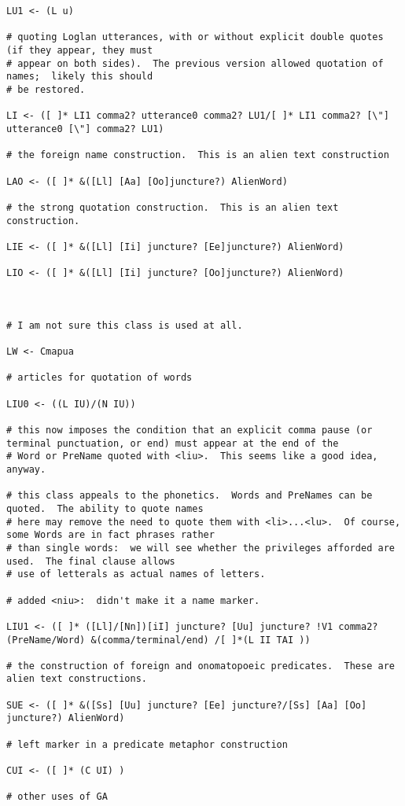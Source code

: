\documentclass[12pt]{book}
\begin{document}
{\begin{verbatim}
LU1 <- (L u)

# quoting Loglan utterances, with or without explicit double quotes (if they appear, they must
# appear on both sides).  The previous version allowed quotation of names;  likely this should
# be restored.

LI <- ([ ]* LI1 comma2? utterance0 comma2? LU1/[ ]* LI1 comma2? [\"] utterance0 [\"] comma2? LU1)

# the foreign name construction.  This is an alien text construction

LAO <- ([ ]* &([Ll] [Aa] [Oo]juncture?) AlienWord)

# the strong quotation construction.  This is an alien text construction.

LIE <- ([ ]* &([Ll] [Ii] juncture? [Ee]juncture?) AlienWord)

LIO <- ([ ]* &([Ll] [Ii] juncture? [Oo]juncture?) AlienWord)



# I am not sure this class is used at all.

LW <- Cmapua

# articles for quotation of words

LIU0 <- ((L IU)/(N IU))

# this now imposes the condition that an explicit comma pause (or terminal punctuation, or end) must appear at the end of the
# Word or PreName quoted with <liu>.  This seems like a good idea, anyway.

# this class appeals to the phonetics.  Words and PreNames can be quoted.  The ability to quote names
# here may remove the need to quote them with <li>...<lu>.  Of course, some Words are in fact phrases rather
# than single words:  we will see whether the privileges afforded are used.  The final clause allows
# use of letterals as actual names of letters.

# added <niu>:  didn't make it a name marker.

LIU1 <- ([ ]* ([Ll]/[Nn])[iI] juncture? [Uu] juncture? !V1 comma2? (PreName/Word) &(comma/terminal/end) /[ ]*(L II TAI ))

# the construction of foreign and onomatopoeic predicates.  These are alien text constructions.

SUE <- ([ ]* &([Ss] [Uu] juncture? [Ee] juncture?/[Ss] [Aa] [Oo] juncture?) AlienWord)

# left marker in a predicate metaphor construction

CUI <- ([ ]* (C UI) )

# other uses of GA


\end{verbatim}}
\end{document}
